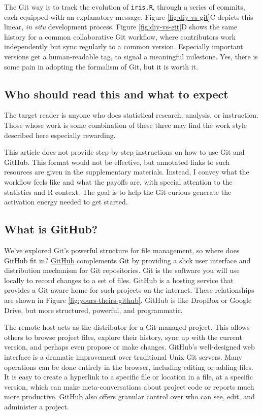 \documentclass[12pt]{article}
\begin{document}
The Git way is to track the evolution of \texttt{iris.R}, through a
series of commits, each equipped with an explanatory message. Figure
\ref{fig:diy-vs-git}C depicts this linear, \emph{in situ} development
process. Figure \ref{fig:diy-vs-git}D shows the same history for a
common collaborative Git workflow, where contributors work independently
but sync regularly to a common version. Especially important versions
get a human-readable tag, to signal a meaningful milestone. Yes, there
is some pain in adopting the formalism of Git, but it is worth it.

\subsection{Who should read this and what to
expect}\label{who-should-read-this-and-what-to-expect}

The target reader is anyone who does statistical research, analysis, or
instruction. Those whose work is some combination of these three may
find the work style described here especially rewarding.

This article does not provide step-by-step instructions on how to use
Git and GitHub. This format would not be effective, but annotated links
to such resources are given in the supplementary materials. Instead, I
convey what the workflow feels like and what the payoffs are, with
special attention to the statistics and R context. The goal is to help
the Git-curious generate the activation energy needed to get started.

\subsection{What is GitHub?}\label{what-is-github}

We've explored Git's powerful structure for file management, so where
does GitHub fit in? \href{https://github.com}{GitHub} complements Git by
providing a slick user interface and distribution mechanism for Git
repositories. Git is the software you will use locally to record changes
to a set of files. GitHub is a hosting service that provides a Git-aware
home for such projects on the internet. These relationships are shown in
Figure \ref{fig:yours-theirs-github}. GitHub is like DropBox or Google
Drive, but more structured, powerful, and programmatic.

The remote host acts as the distributor for a Git-managed project. This
allows others to browse project files, explore their history, sync up
with the current version, and perhaps even propose or make changes.
GitHub's well-designed web interface is a dramatic improvement over
traditional Unix Git servers. Many operations can be done entirely in
the browser, including editing or adding files. It is easy to create a
hyperlink to a specific file or location in a file, at a specific
version, which can make meta-conversations about project code or reports
much more productive. GitHub also offers granular control over who can
see, edit, and administer a project.
\end{document}
